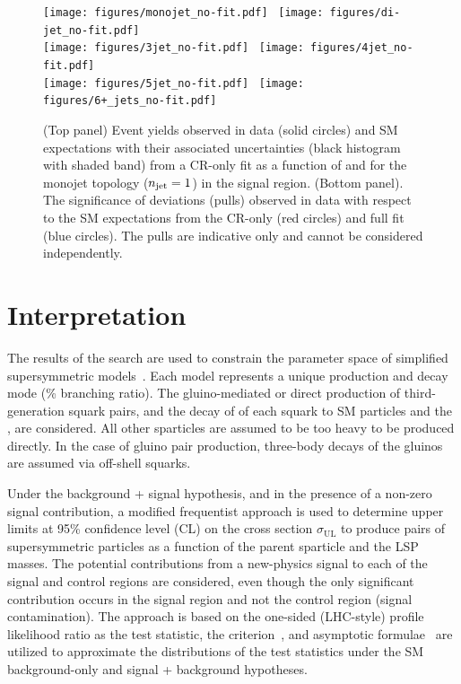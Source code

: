 \clearpage
\begin{figure}[!t]
  \centering
  \begin{center}
    \caption{(Top panel) Event yields observed in data (solid circles)
      and SM expectations with their associated uncertainties (black
      histogram with shaded band) from a CR-only fit as a function of
      \nb and \scalht for the monojet topology ($n_{\text{jet}} = 1$) in the
      signal region. (Bottom panel). The significance of deviations
      (pulls) observed in data with respect to the SM expectations
      from the CR-only (red circles) and full fit (blue circles). The
      pulls are indicative only and cannot be considered
      independently.}
    \texttt{[image: figures/monojet\_no-fit.pdf]}~ 
    \texttt{[image: figures/di-jet\_no-fit.pdf]}\\
    \texttt{[image: figures/3jet\_no-fit.pdf]}~
    \texttt{[image: figures/4jet\_no-fit.pdf]}\\
    \texttt{[image: figures/5jet\_no-fit.pdf]}~
    \texttt{[image: figures/6+\_jets\_no-fit.pdf]}\\
    \label{fig:mono}
  \end{center}
\end{figure}


\clearpage
\section{Interpretation}
\label{sec:interpretations}

The results of the search are used to constrain the parameter space of
simplified supersymmetric models~\cite{Alwall:2008ag, Alwall:2008va,
  sms}. Each model represents a unique production and decay mode (\% branching ratio). The gluino-mediated or direct production of
third-generation squark pairs, and the decay of of each squark to SM
particles and the \chiz, are considered. All other sparticles are
assumed to be too heavy to be produced directly. In the case of gluino
pair production, three-body decays of the gluinos are assumed via
off-shell squarks.

Under the background + signal hypothesis, and in the presence of a
non-zero signal contribution, a modified frequentist approach is used
to determine upper limits at 95\% confidence level (CL) on the cross
section $\sigma_\text{UL}$ to produce pairs of supersymmetric
particles as a function of the parent sparticle and the LSP
masses. The potential contributions from a new-physics signal to each
of the signal and control regions are considered, even though the only
significant contribution occurs in the signal region and not the
control region (\ie signal contamination). The approach is based on
the one-sided (LHC-style) profile likelihood ratio as the test
statistic, the \cls criterion~\cite{junk, read}, and asymptotic
formulae~\cite{Cowan:2010js} are utilized to approximate the
distributions of the test statistics under the SM background-only and
signal + background hypotheses.

